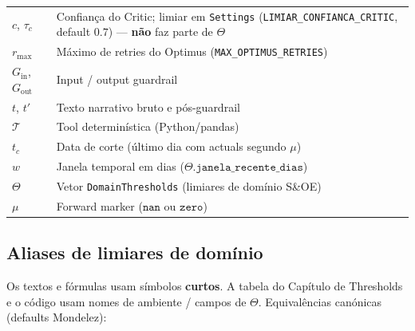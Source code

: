 \documentclass[a4paper, 12pt]{report}
\theoremstyle{definition}
\theoremstyle{remark}
\newcommand{\tool}{\mathcal{T}}
\begin{document}
\begin{longtable}{lp{9.5cm}}
  $c$, $\tau_c$ & Confian\c{c}a do Critic; limiar em \texttt{Settings}
    (\texttt{LIMIAR\_CONFIANCA\_CRITIC}, default $0.7$) --- \textbf{n\~ao} faz parte de $\Theta$ \\
  $r_{\max}$ & M\'aximo de retries do Optimus (\texttt{MAX\_OPTIMUS\_RETRIES}) \\
  $G_{\text{in}}$, $G_{\text{out}}$ & Input / output guardrail \\
  $t$, $t'$ & Texto narrativo bruto e p\'os-guardrail \\
  $\tool$ & Tool determin\'istica (Python/pandas) \\
  $t_c$ & Data de corte (\'ultimo dia com actuals segundo $\mu$) \\
  $w$ & Janela temporal em dias ($\Theta.\texttt{janela\_recente\_dias}$) \\
  $\Theta$ & Vetor \texttt{DomainThresholds} (limiares de dom\'inio S\&OE) \\
  $\mu$ & Forward marker ($\texttt{nan}$ ou $\texttt{zero}$) \\
  \bottomrule
\end{longtable}

\subsection{Aliases de limiares de dom\'inio}
\label{subsec:aliases-limiares}

Os textos e f\'ormulas usam s\'imbolos \textbf{curtos}. A tabela do Cap\'itulo
de Thresholds e o c\'odigo usam nomes de ambiente / campos de $\Theta$.
Equival\^encias can\'onicas (defaults Mondelez):
\end{document}
